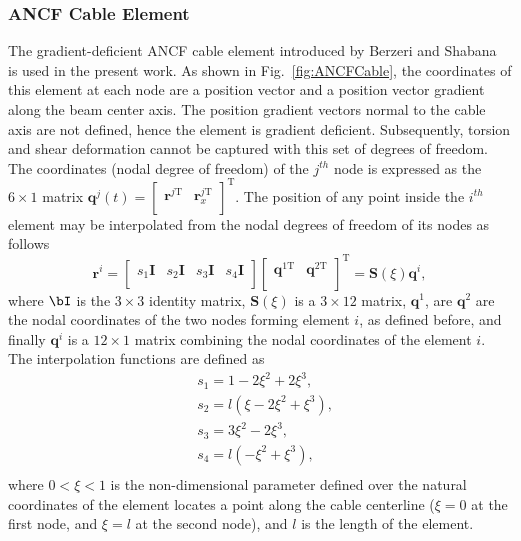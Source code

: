 \subsubsection*{ANCF Cable Element}\label{sec:1DElem}
The gradient-deficient ANCF cable element introduced by Berzeri and Shabana~\cite{berzeri2000} is used in the present work. As shown in Fig.~\ref{fig:ANCFCable}, the coordinates of this element at each node are a position vector and a position vector gradient along the beam center axis. The position gradient vectors normal to the cable axis are not defined, hence the element is gradient deficient. Subsequently, torsion and shear deformation cannot be captured with this set of degrees of freedom. The coordinates (nodal degree of freedom) of the $j^{th}$ node is expressed as the $6 \times 1$ matrix \small${{\bm{q}}^{j}}(t)={{\left[ \begin{matrix}
		\bm{r}_{{}}^{j\text{T}} & \bm{r}_{x}^{j\text{T}}  \\
		\end{matrix} \right]}^{\text{T}}}$. \normalsize The position of any point inside the $i^{th}$ element may be interpolated from the nodal degrees of freedom of its nodes as follows
\begin{equation} \label{eq:ANCF_Beam_r}
\bm{r}^{i}=\left[ \begin{matrix}
{{s}_{1}}\bm{I} & {{s}_{2}}\bm{I} & {{s}_{3}}\bm{I} & {{s}_{4}}\bm{I}  \\
\end{matrix} \right]\left[ \begin{matrix}
\bm{q}_{}^{1\text{T}} & \bm{q}_{}^{2\text{T}}  \\
\end{matrix} \right]^\text{T}=\bm{S}\left( \xi  \right)\bm{q}^{i},
\end{equation}
where $\bI$ is the $3\times3$ identity matrix, $\bm{S}\left( \xi  \right)$ is a $3 \times 12$ matrix, $\bm{q}^1$, are $\bm{q}^2$ are the nodal coordinates of the two nodes forming element $i$, as defined before, and finally $\bm{q}^{i}$ is a $12\times1$ matrix combining the nodal coordinates of the element $i$. The interpolation functions are defined as
\begin{equation} \label{eq:ANCF_Beam_Shapefunctions}
\begin{split}
& {{s}_{1}}=1-2{{\xi}^{2}}+2{{\xi}^{3}}, \\
& {{s}_{2}}=l\left( \xi-2{{\xi}^{2}}+{{\xi}^{3}} \right), \\
& {{s}_{3}}=3{{\xi}^{2}}-2{{\xi}^{3}}, \\
& {{s}_{4}}=l\left( -{{\xi}^{2}}+{{\xi}^{3}} \right), \\
\end{split}
\end{equation}
where $0<\xi <1$ is the non-dimensional parameter defined over the natural coordinates of the element locates a point along the cable centerline ($\xi=0$ at the first node, and $\xi=l$ at the second node), and $l$ is the length of the element.

